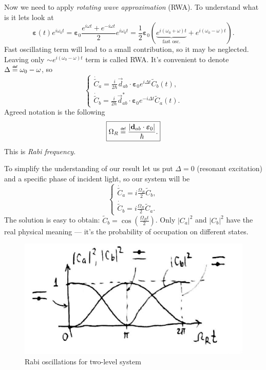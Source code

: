 Now we need to apply \textit{rotating wave approximation} (RWA). To understand what is it lets look at
\begin{equation}
	\bm{\varepsilon}(t) e^{i \omega_0 t} = \bm{\varepsilon}_0 \frac{e^{i \omega t} + e^{- i \omega t}}{2} e^{i \omega_0 t}= \frac{1}{2} \bm{\varepsilon}_0 \left( \underbrace{e^{i(\omega_0 + \omega) t}}_{\text{fast osc.}} + e^{i(\omega_0 - \omega) t} \right).
\end{equation}
Fast oscillating term will lead to a small contribution, so it may be neglected. Leaving only $\sim e^{i (\omega_0 - \omega)t}$ term is called RWA. It's convenient to denote $\Delta \myeq \omega_0 - \omega$, so
\begin{equation}
	\begin{cases}
		\dot{\widetilde{C}}_a = \frac{i}{2\hbar}\vec{d}_{ab} \cdot \bm{\varepsilon}_0 e^{i \Delta t} \widetilde{C}_b(t), \\
		\dot{\widetilde{C}}_b = \frac{i}{2\hbar}\vec{d}^*_{ab} \cdot \bm{\varepsilon}_0 e^{-i \Delta t} \widetilde{C}_a(t).
	\end{cases}
\end{equation}
Agreed notation is the following
\begin{equation}
	\boxed{\Omega_R \myeq \frac{\left|\vec{d}_{ab} \cdot \bm{\varepsilon}_0\right|}{\hbar}.}
\end{equation}
This is \textit{Rabi frequency}.

To simplify the understanding of our result let us put $\Delta =0$ (resonant excitation) and a specific phase of incident light, so our system will be
\begin{equation}
	\begin{cases}
		\dot{\widetilde{C}}_a = i \frac{\Omega_R}{2} \widetilde{C}_b, \\
		\dot{\widetilde{C}}_b = i \frac{\Omega_R}{2} \widetilde{C}_a.
	\end{cases}
	\label{eq:rabi_system}
\end{equation}
The solution is easy to obtain: $\widetilde{C}_b = \cos \left( \frac{\Omega_R t}{2} \right)$. Only $\left| C_a\right|^2$ and $\left| C_b \right|^2$ have the real physical meaning --- it's the probability of occupation on different states.
\begin{figure}[h!]
	\centering
	\includegraphics[width=0.65\linewidth]{fig/L4/rabi_osc}
	\caption{Rabi oscillations for two-level system}
	\label{fig:rabiosc}
\end{figure}

